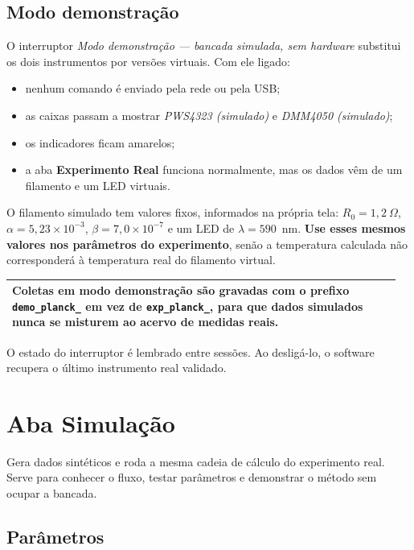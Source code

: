 \documentclass[11pt,a4paper]{article}
\newcommand{\aba}[1]{\textsf{\textbf{#1}}}
\newcommand{\campo}[1]{\textsf{\textit{#1}}}
\newenvironment{aviso}
  {\par\medskip\noindent\begin{tabular}{|p{0.96\linewidth}|}\hline\rule{0pt}{3ex}}
  {\\[1ex]\hline\end{tabular}\par\medskip}
\begin{document}
\subsection{Modo demonstração}
\label{sec:demo}

O interruptor \campo{Modo demonstração --- bancada simulada, sem hardware}
substitui os dois instrumentos por versões virtuais. Com ele ligado:

\begin{itemize}[nosep]
  \item nenhum comando é enviado pela rede ou pela USB;
  \item as caixas passam a mostrar \emph{PWS4323 (simulado)} e
        \emph{DMM4050 (simulado)};
  \item os indicadores ficam amarelos;
  \item a aba \aba{Experimento Real} funciona normalmente, mas os dados vêm de
        um filamento e um LED virtuais.
\end{itemize}

O filamento simulado tem valores fixos, informados na própria tela:
$R_0 = 1{,}2~\Omega$, $\alpha = 5{,}23 \times 10^{-3}$,
$\beta = 7{,}0 \times 10^{-7}$ e um LED de $\lambda = 590$~nm. \textbf{Use esses
mesmos valores nos parâmetros do experimento}, senão a temperatura calculada
não corresponderá à temperatura real do filamento virtual.

\begin{aviso}
Coletas em modo demonstração são gravadas com o prefixo
\texttt{demo\_planck\_} em vez de \texttt{exp\_planck\_}, para que dados
simulados nunca se misturem ao acervo de medidas reais.
\end{aviso}

O estado do interruptor é lembrado entre sessões. Ao desligá-lo, o software
recupera o último instrumento real validado.

\section{Aba Simulação}

Gera dados sintéticos e roda a mesma cadeia de cálculo do experimento real.
Serve para conhecer o fluxo, testar parâmetros e demonstrar o método sem
ocupar a bancada.

\subsection{Parâmetros}
\end{document}
